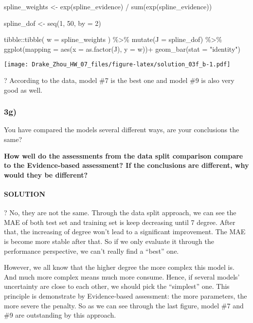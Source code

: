 \documentclass[
]{article}
\newenvironment{Shaded}{\begin{snugshade}}{\end{snugshade}}
\newcommand{\AttributeTok}[1]{\textcolor[rgb]{0.77,0.63,0.00}{#1}}
\newcommand{\DecValTok}[1]{\textcolor[rgb]{0.00,0.00,0.81}{#1}}
\newcommand{\FunctionTok}[1]{\textcolor[rgb]{0.00,0.00,0.00}{#1}}
\newcommand{\NormalTok}[1]{#1}
\newcommand{\OtherTok}[1]{\textcolor[rgb]{0.56,0.35,0.01}{#1}}
\newcommand{\SpecialCharTok}[1]{\textcolor[rgb]{0.00,0.00,0.00}{#1}}
\newcommand{\StringTok}[1]{\textcolor[rgb]{0.31,0.60,0.02}{#1}}
\begin{document}
\begin{Shaded}
\begin{Highlighting}[]
\NormalTok{spline\_weights }\OtherTok{\textless{}{-}} \FunctionTok{exp}\NormalTok{(spline\_evidence) }\SpecialCharTok{/} \FunctionTok{sum}\NormalTok{(}\FunctionTok{exp}\NormalTok{(spline\_evidence))}

\NormalTok{spline\_dof }\OtherTok{\textless{}{-}} \FunctionTok{seq}\NormalTok{(}\DecValTok{1}\NormalTok{, }\DecValTok{50}\NormalTok{, }\AttributeTok{by =} \DecValTok{2}\NormalTok{)}

\NormalTok{tibble}\SpecialCharTok{::}\FunctionTok{tibble}\NormalTok{(}
  \AttributeTok{w =}\NormalTok{ spline\_weights}
\NormalTok{) }\SpecialCharTok{\%\textgreater{}\%} 
  \FunctionTok{mutate}\NormalTok{(}\AttributeTok{J =}\NormalTok{ spline\_dof) }\SpecialCharTok{\%\textgreater{}\%} 
  \FunctionTok{ggplot}\NormalTok{(}\AttributeTok{mapping =} \FunctionTok{aes}\NormalTok{(}\AttributeTok{x =} \FunctionTok{as.factor}\NormalTok{(J), }\AttributeTok{y =}\NormalTok{ w))}\SpecialCharTok{+}
  \FunctionTok{geom\_bar}\NormalTok{(}\AttributeTok{stat =} \StringTok{"identity"}\NormalTok{)}
\end{Highlighting}
\end{Shaded}

\texttt{[image: Drake\_Zhou\_HW\_07\_files/figure-latex/solution\_03f\_b-1.pdf]}

? According to the data, model \#7 is the best one and model \#9 is also
very good as well.

\hypertarget{g-1}{%
\subsubsection{3g)}\label{g-1}}

You have compared the models several different ways, are your
conclusions the same?

\textbf{How well do the assessments from the data split comparison
compare to the Evidence-based assessment? If the conclusions are
different, why would they be different?}

\hypertarget{solution-18}{%
\paragraph{SOLUTION}\label{solution-18}}

? No, they are not the same. Through the data split approach, we can see
the MAE of both test set and training set is keep decreasing until 7
degree. After that, the increasing of degree won't lead to a significant
improvement. The MAE is become more stable after that. So if we only
evaluate it through the performance perspective, we can't really find a
``best'' one.

However, we all know that the higher degree the more complex this model
is. And much more complex means much more consume. Hence, if several
models' uncertainty are close to each other, we should pick the
``simplest'' one. This principle is demonstrate by Evidence-based
assessment: the more parameters, the more severe the penalty. So as we
can see through the last figure, model \#7 and \#9 are outstanding by
this approach.
\end{document}
